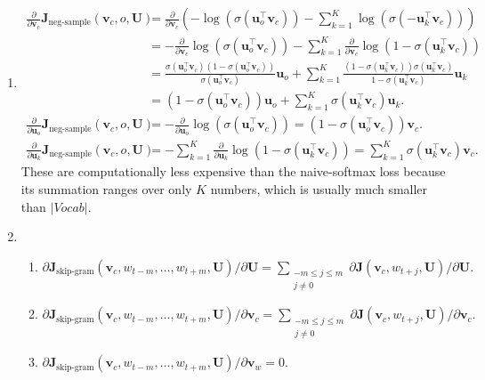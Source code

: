 \documentclass[12pt]{article}
\begin{document}
\begin{enumerate}[label=(\alph*)]
\item \begin{align*} \frac{\partial}{\partial\bm{v}_c}\bm{J}_{\textrm{neg-sample}}(\bm{v}_c,o,\bm{U}) &=\frac{\partial}{\partial\bm{v}_c}\left(-\log(\sigma(\bm{u}_o^\top\bm{v}_c))-\sum_{k=1}^K\log(\sigma(-\bm{u}_k^\top\bm{v}_c))\right) \\
&=-\frac{\partial}{\partial\bm{v}_c}\log(\sigma(\bm{u}_o^\top\bm{v}_c))-\sum_{k=1}^K\frac{\partial}{\partial\bm{v}_c}\log(1-\sigma(\bm{u}_k^\top\bm{v}_c)) \\
&=\frac{\sigma(\bm{u}_o^\top\bm{v}_c)(1-\sigma(\bm{u}_o^\top\bm{v}_c))}{\sigma(\bm{u}_o^\top\bm{v}_c)}\bm{u}_o+\sum_{k=1}^K\frac{(1-\sigma(\bm{u}_k^\top\bm{v}_c))\sigma(\bm{u}_k^\top\bm{v}_c)}{1-\sigma(\bm{u}_k^\top\bm{v}_c)}\bm{u}_k \\
&=(1-\sigma(\bm{u}_o^\top\bm{v}_c))\bm{u}_o+\sum_{k=1}^K\sigma(\bm{u}_k^\top\bm{v}_c)\bm{u}_k. \\
\frac{\partial}{\partial\bm{u}_o}\bm{J}_{\textrm{neg-sample}}(\bm{v}_c,o,\bm{U}) &=-\frac{\partial}{\partial\bm{u}_o}\log(\sigma(\bm{u}_o^\top\bm{v}_c))=(1-\sigma(\bm{u}_o^\top\bm{v}_c))\bm{v}_c.\\
\frac{\partial}{\partial\bm{u}_k}\bm{J}_{\textrm{neg-sample}}(\bm{v}_c,o,\bm{U}) &=-\sum_{k=1}^K\frac{\partial}{\partial\bm{u}_k}\log(1-\sigma(\bm{u}_k^\top\bm{v}_c))=\sum_{k=1}^K\sigma(\bm{u}_k^\top\bm{v}_c)\bm{v}_c.
\end{align*}
These are computationally less expensive than the naive-softmax loss because its summation ranges over only $K$ numbers, which is usually much smaller than $|Vocab|$.
\item \begin{enumerate}[label=(\roman*)]
  \item $\partial\bm{J}_{\textrm{skip-gram}}(\bm{v}_c,w_{t-m},\ldots,w_{t+m},\bm{U})/\partial\bm{U}=\sum\limits_{\substack{-m\leq j\leq m\\j\neq 0}}\partial\bm{J}(\bm{v}_c,w_{t+j},\bm{U})/\partial\bm{U}.$
  \item $\partial\bm{J}_{\textrm{skip-gram}}(\bm{v}_c,w_{t-m},\ldots,w_{t+m},\bm{U})/\partial\bm{v}_c=\sum\limits_{\substack{-m\leq j\leq m\\j\neq 0}}\partial\bm{J}(\bm{v}_c,w_{t+j},\bm{U})/\partial\bm{v}_c.$
  \item $\partial\bm{J}_{\textrm{skip-gram}}(\bm{v}_c,w_{t-m},\ldots,w_{t+m},\bm{U})/\partial\bm{v}_w=0.$
\end{enumerate}
\end{enumerate}
\end{document}
